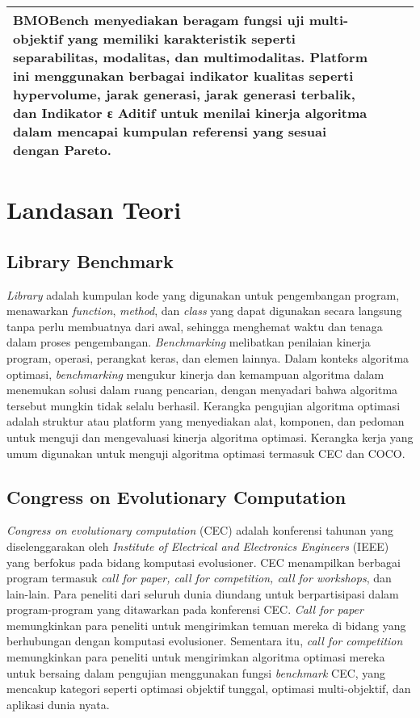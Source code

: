 \begin{landscape}
\begin{longtable}[c]{|p{2cm}|p{2cm}|p{10cm}|p{8cm}|}
  BMOBench menyediakan beragam fungsi uji multi-objektif yang memiliki karakteristik seperti separabilitas, modalitas, dan multimodalitas. Platform ini menggunakan berbagai indikator kualitas seperti hypervolume, jarak generasi, jarak generasi terbalik, dan Indikator ε Aditif untuk menilai kinerja algoritma dalam mencapai kumpulan referensi yang sesuai dengan Pareto. \\ \hline
\end{longtable}
\end{landscape}

\newpage
\section{Landasan Teori}
\subsection{Library Benchmark}
\textit{Library} adalah kumpulan kode yang digunakan untuk pengembangan program, menawarkan \textit{function}, \textit{method}, dan \textit{class} yang dapat digunakan secara langsung tanpa perlu membuatnya dari awal, sehingga menghemat waktu dan tenaga dalam proses pengembangan. \textit{Benchmarking} melibatkan penilaian kinerja program, operasi, perangkat keras, dan elemen lainnya. Dalam konteks algoritma optimasi, \textit{benchmarking} mengukur kinerja dan kemampuan algoritma dalam menemukan solusi dalam ruang pencarian, dengan menyadari bahwa algoritma tersebut mungkin tidak selalu berhasil. Kerangka pengujian algoritma optimasi adalah struktur atau platform yang menyediakan alat, komponen, dan pedoman untuk menguji dan mengevaluasi kinerja algoritma optimasi. Kerangka kerja yang umum digunakan untuk menguji algoritma optimasi termasuk CEC dan COCO.
\subsection{Congress on Evolutionary Computation}
\textit{Congress on evolutionary computation} (CEC) adalah konferensi tahunan yang diselenggarakan oleh \textit{Institute of Electrical and Electronics Engineers} (IEEE) yang berfokus pada bidang komputasi evolusioner. CEC menampilkan berbagai program termasuk \textit{call for paper, call for competition, call for workshops}, dan lain-lain. Para peneliti dari seluruh dunia diundang untuk berpartisipasi dalam program-program yang ditawarkan pada konferensi CEC. \textit{Call for paper} memungkinkan para peneliti untuk mengirimkan temuan mereka di bidang yang berhubungan dengan komputasi evolusioner. Sementara itu, \textit{call for competition} memungkinkan para peneliti untuk mengirimkan algoritma optimasi mereka untuk bersaing dalam pengujian menggunakan fungsi \textit{benchmark} CEC, yang mencakup kategori seperti optimasi objektif tunggal, optimasi multi-objektif, dan aplikasi dunia nyata.
